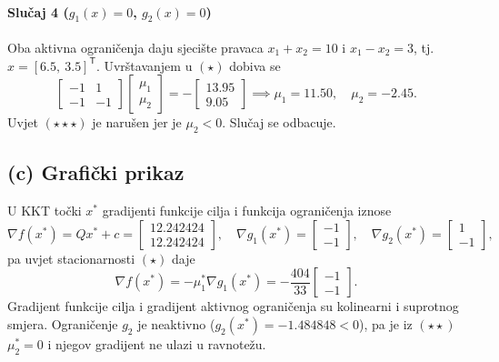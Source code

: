 \paragraph{Slučaj 4 ($g_1(x) = 0$, $g_2(x) = 0$)}
Oba aktivna ograničenja daju sjecište pravaca $x_1 + x_2 = 10$ i $x_1 - x_2 = 3$, tj.\ $x = [6.5,\ 3.5]^{\mathsf{T}}$. Uvrštavanjem u $(\star)$ dobiva se
\begin{equation}
\begin{bmatrix} -1 & 1 \\ -1 & -1 \end{bmatrix} \begin{bmatrix} \mu_1 \\ \mu_2 \end{bmatrix}
= -\begin{bmatrix} 13.95 \\ 9.05 \end{bmatrix} \implies \mu_1 = 11.50, \quad \mu_2 = -2.45.
\end{equation}
Uvjet $(\star\star\star)$ je narušen jer je $\mu_2 < 0$. Slučaj se odbacuje.

\subsection{(c) Grafički prikaz}

U KKT točki $x^*$ gradijenti funkcije cilja i funkcija ograničenja iznose
\begin{equation}
\nabla f(x^*) = Q x^* + c = \begin{bmatrix} 12.242424 \\ 12.242424 \end{bmatrix}, \quad
\nabla g_1(x^*) = \begin{bmatrix} -1 \\ -1 \end{bmatrix}, \quad
\nabla g_2(x^*) = \begin{bmatrix} 1 \\ -1 \end{bmatrix},
\end{equation}
pa uvjet stacionarnosti $(\star)$ daje
\begin{equation}
\nabla f(x^*) = -\mu_1^* \nabla g_1(x^*) = -\frac{404}{33} \begin{bmatrix} -1 \\ -1 \end{bmatrix}.
\end{equation}
Gradijent funkcije cilja i gradijent aktivnog ograničenja su kolinearni i suprotnog smjera. Ograničenje $g_2$ je neaktivno ($g_2(x^*) = -1.484848 < 0$), pa je iz $(\star\star)$ $\mu_2^* = 0$ i njegov gradijent ne ulazi u ravnotežu.

